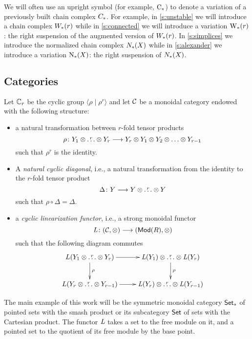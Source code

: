 \begin{notation}
	We will often use an upright symbol (for example, $\operatorname{C}_{*}$) to denote a variation of a previously built chain complex $C_{*}$. For example, in \cref{s:unstable} we will introduce a chain complex $W_{*}(r)$ while in \cref{s:connected} we will introduce a variation $\operatorname{W}_{*}(r)$: the right suspension of the augmented version of $W_{*}(r)$. In \cref{s:simplices} we introduce the normalized chain complex $N_{*}(X)$ while in \cref{s:alexander} we introduce a variation $\operatorname{N}_{*}(X)$: the right suspension of $N_{*}(X)$.
\end{notation}


\subsection{Categories}\label{s:categories}

Let $\mathbb{C}_r$ be the cyclic group $\langle\rho\mid \rho^r\rangle$ and let $\mathcal{C}$ be a monoidal category %
endowed with the following structure:
\begin{itemize}
	\item a natural transformation between $r$-fold tensor products
	\[
	\rho \colon Y_1 \ot \overset{r}{\dots} \ot Y_r \lra Y_r \ot Y_1 \ot Y_2 \ot \dots \ot Y_{r-1}
	\]
	such that $\rho^r$ is the identity.
	\item A \emph{natural cyclic diagonal}, i.e., a natural transformation from the identity to the $r$-fold tensor product
	\[
	\Delta \colon Y \longrightarrow Y \otimes \overset{r}{\dots} \otimes Y
	\]
	such that $\rho\circ \Delta = \Delta$.
	\item a \emph{cyclic linearization functor}, i.e., a %
 strong monoidal functor
	\[
	\operatorname{{\it L}} \colon (\mathcal{C}, \otimes ) \longrightarrow (\mathsf{Mod}(R), \otimes )
	\]
	such that the following diagram commutes
	\[
	\xymatrix{
		L(Y_1 \ot \overset{r}{\dots} \ot Y_r) \ar[r]\ar[d]^{\rho} & \abel(Y_1) \ot \overset{r}{\dots} \ot \abel(Y_r)\ar[d]^{\rho} \\
		L(Y_{r} \ot \overset{r}{\dots} \ot Y_{r-1}) \ar[r] & \abel(Y_r) \ot \overset{r}{\dots} \ot \abel(Y_{r-1}) }
	\]
\end{itemize}
The main example of this work will be the symmetric monoidal category $\mathsf{Set}_*$ of pointed sets with the smash product or its subcategory $\mathsf{Set}$ of sets with the Cartesian product. The functor $\operatorname{{\it L}}$ takes a set to the free module on it, and a pointed set to the quotient of its free module by the base point.

